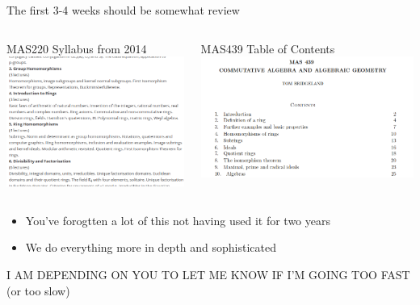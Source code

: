 \documentclass{beamer}
\begin{document}
\begin{frame}{The first 3-4 weeks should be somewhat review}

\begin{columns}
\begin{block}{MAS220 Syllabus from 2014}
 \includegraphics[width=.9\linewidth]{MAS220}
\end{block}
\begin{block}{MAS439 Table of Contents}
\includegraphics[width=.9\linewidth]{TOC}
\end{block}
\end{columns}
\begin{itemize}
\item You've forogtten a lot of this not having used it for two years
\item We do everything more in depth and sophisticated
\end{itemize}
\alert{I AM DEPENDING ON YOU TO LET ME KNOW IF I'M GOING TOO FAST} (or too slow)

\end{frame}
\end{document}
